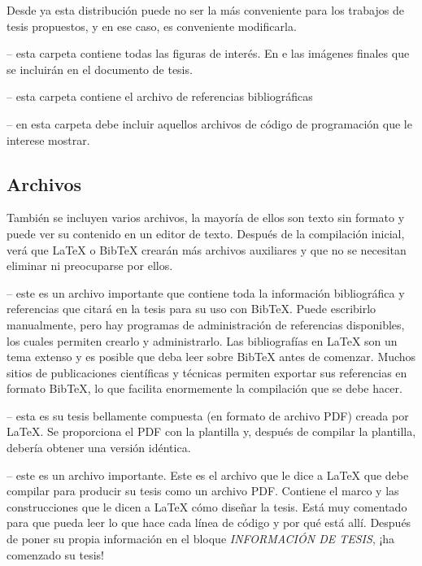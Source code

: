Desde ya esta distribución puede no ser la más conveniente para los trabajos de tesis propuestos, y en ese caso, es conveniente modificarla. 

 -- esta carpeta contiene todas las figuras de interés. En e las imágenes finales que se incluirán en el documento de tesis.

 -- esta carpeta contiene el archivo de referencias bibliográficas 

 -- en esta carpeta debe incluir aquellos archivos de código de programación que le interese mostrar.

\subsection{Archivos}

También se incluyen varios archivos, la mayoría de ellos son texto sin formato y puede ver su contenido en un editor de texto. Después de la compilación inicial, verá que \LaTeX{}  o BibTeX crearán más archivos auxiliares y que no se necesitan eliminar ni preocuparse por ellos.

 -- este es un archivo importante que contiene toda la información bibliográfica y referencias que citará en la tesis para su uso con BibTeX. Puede escribirlo manualmente, pero hay programas de administración de referencias disponibles, los cuales permiten crearlo y administrarlo. Las bibliografías en \LaTeX{} son un tema extenso y es posible que deba leer sobre BibTeX antes de comenzar. Muchos sitios de publicaciones científicas y técnicas permiten exportar sus referencias en formato BibTeX, lo que facilita enormemente la compilación que se debe hacer.

 -- esta es su tesis bellamente compuesta (en formato de archivo PDF) creada por \LaTeX {}. Se proporciona  el PDF con la plantilla y, después de compilar la plantilla, debería obtener una versión idéntica.

 -- este es un archivo importante. Este es el archivo que le dice a \LaTeX{} que debe compilar para producir su tesis como un archivo PDF. Contiene el marco y las construcciones que le dicen a \LaTeX{} cómo diseñar la tesis. Está muy comentado para que pueda leer lo que hace cada línea de código y por qué está allí. Después de poner su propia información en el bloque \emph{INFORMACIÓN DE TESIS}, ¡ha comenzado su tesis!
\\

